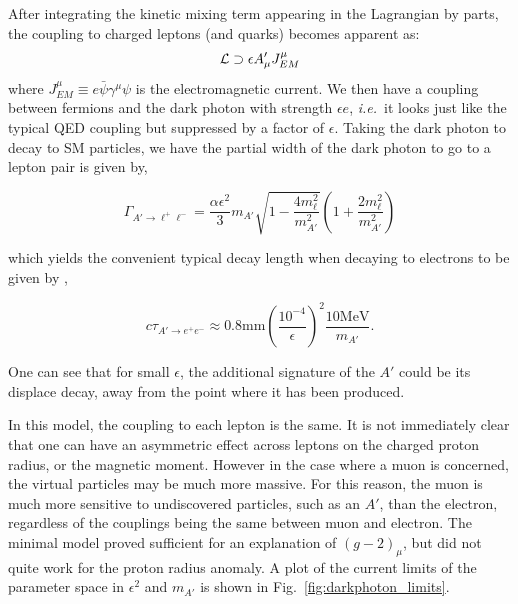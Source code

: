 After integrating the kinetic mixing term appearing in the Lagrangian by parts, the coupling to charged leptons (and quarks) becomes apparent as:
\begin{equation}
    \label{eqn:darkphoton_qed_current}
    \operatorname{\mathcal{L}} \supset \epsilon A'_\mu J^\mu_{EM}
\end{equation}
where $J^\mu_{EM} \equiv e \bar{\psi} \gamma^\mu \psi$ is the electromagnetic current.
We then have a coupling between fermions and the dark photon with strength $\epsilon e$, {\em i.e.}\ it looks just like the typical QED coupling but suppressed by a factor of $\epsilon$.
Taking the dark photon to decay to SM particles, we have the partial width of the dark photon to go to a lepton pair is given by,

\begin{equation}
    \Gamma_{A' \rightarrow \ell^+ \ell^-} = \frac{\alpha \epsilon^2}{3} m_{A'} \sqrt{1-\frac{4 m_\ell^2}{m_{A'}^2}}\left(1 + \frac{2 m_\ell^2}{m_{A'}^2}\right)
\end{equation}

\noindent which yields the convenient typical decay length when decaying to electrons to be given by \cite{Echenard:2014lma},

\begin{equation}
    c \tau_{A' \rightarrow e^+ e^-} \approx 0.8\textrm{mm} \left(\frac{10^{-4}}{\epsilon}\right)^2 \frac{10\textrm{MeV}}{m_{A'}}\textrm{.}
\end{equation}

\noindent One can see that for small $\epsilon$, the additional signature of the $A'$ could be its displace decay, away from the point where it has been produced.

In this model, the coupling to each lepton is the same.
It is not immediately clear that one can have an asymmetric effect across leptons on the charged proton radius, or the magnetic moment.
However in the case where a muon is concerned, the virtual particles may be much more massive.
For this reason, the muon is much more sensitive to undiscovered particles, such as an $A'$, than the electron, regardless of the couplings being the same between muon and electron.
The minimal model proved sufficient for an explanation of $(g-2)_\mu$, but did not quite work for the proton radius anomaly.
A plot of the current limits of the parameter space in $\epsilon^2$ and $m_{A'}$ is shown in Fig.\ \ref{fig:darkphoton_limits}.

